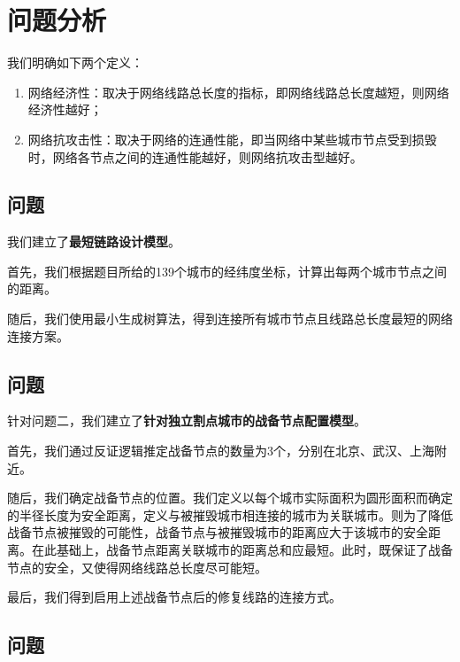 \documentclass{article}
\begin{document}
\section{问题分析}%
\label{sec:问题分析}

我们明确如下两个定义：

\begin{enumerate}
	\item 网络经济性：取决于网络线路总长度的指标，即网络线路总长度越短，则网络经济性越好；
	\item 网络抗攻击性：取决于网络的连通性能，即当网络中某些城市节点受到损毁时，网络各节点之间的连通性能越好，则网络抗攻击型越好。
\end{enumerate}

\subsection{问题}
\label{sub:问题\chinese{subsection}}

我们建立了\textbf{最短链路设计模型}。

首先，我们根据题目所给的139个城市的经纬度坐标，计算出每两个城市节点之间的距离\cite{刘军伟-421}。

随后，我们使用最小生成树算法\cite{戴文彬-422}，得到连接所有城市节点且线路总长度最短的网络连接方案。

\subsection{问题}
\label{sub:问题\chinese{subsection}}

针对问题二，我们建立了\textbf{针对独立割点城市的战备节点配置模型}。

首先，我们通过反证逻辑推定战备节点的数量为3个，分别在北京、武汉、上海附近。

随后，我们确定战备节点的位置。我们定义以每个城市实际面积为圆形面积而确定的半径长度为安全距离，定义与被摧毁城市相连接的城市为关联城市。则为了降低战备节点被摧毁的可能性，战备节点与被摧毁城市的距离应大于该城市的安全距离。在此基础上，战备节点距离关联城市的距离总和应最短。此时，既保证了战备节点的安全，又使得网络线路总长度尽可能短。

最后，我们得到启用上述战备节点后的修复线路的连接方式。

\subsection{问题}
\label{sub:问题\chinese{subsection}}
\end{document}
